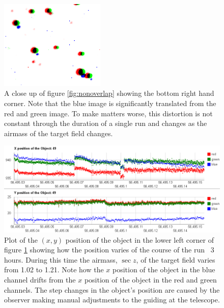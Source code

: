\begin{figure}
  \centering
  \includegraphics[width=50mm]{images/overlay_multiply_closeup.png}
  \caption{A close up of figure \ref{fig:nonoverlap} showing the bottom right hand corner. Note that the blue image is significantly translated from the red and green image. To make matters worse, this distortion is not constant through the duration of a single run and changes as the airmass of the target field changes.}
\label{fig:nonoverlapzoom}
\end{figure}


\begin{figure}
  \centering
  \includegraphics[width=140mm]{images/position_drift.png}
  \caption{Plot of the $(x, y)$ position of the object in the lower left corner of figure \ref{fig:nonoverlapzoom} showing how the position varies of the course of the run ~3 hours. During this time the airmass, $\sec z$, of the target field varies from 1.02 to 1.21. Note how the $x$ position of the object in the blue channel drifts from the $x$ position of the object in the red and green channels. The step changes in the object's position are caused by the observer making manual adjustments to the guiding at the telescope. }
\label{fig:positiondrift}
\end{figure}

